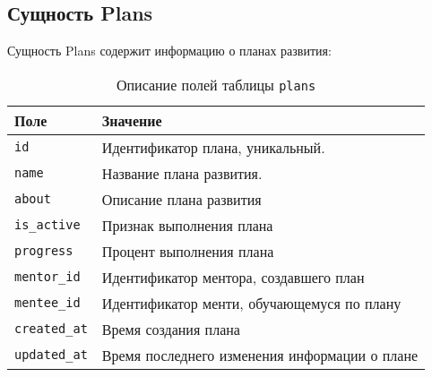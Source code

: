 \subsection{Сущность Plans}
Сущность Plans содержит информацию о планах развития:
\begin{table}[!ht]
    \caption{Описание полей таблицы \texttt{plans}}
    \label{tbl:plans}
    \begin{center}
        \begin{tabular}{|p{}p{}|}
            \hline
            \textbf{Поле} & \textbf{Значение} \\\hline
            \texttt{id} & Идентификатор плана, уникальный. \\\hline
            \texttt{name} & Название плана развития. \\\hline
            \texttt{about} & Описание плана развития\\\hline
            \texttt{is\_active} & Признак выполнения плана \\\hline
            \texttt{progress} & Процент выполнения плана \\\hline
            \texttt{mentor\_id} & Идентификатор ментора, создавшего план \\\hline
            \texttt{mentee\_id} & Идентификатор менти, обучающемуся по плану \\\hline
            \texttt{created\_at} & Время создания плана \\\hline
            \texttt{updated\_at} & Время последнего изменения информации о плане \\\hline
        \end{tabular}
    \end{center}
\end{table}
\newpage
